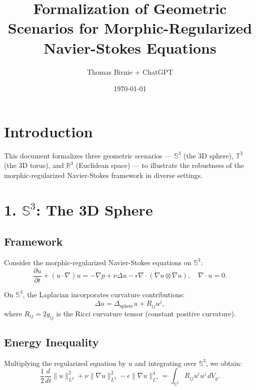 \documentclass[12pt]{article}
\begin{document}
\title{Formalization of Geometric Scenarios for Morphic-Regularized Navier-Stokes Equations}
\author{Thomas Birnie + ChatGPT}
\date{\today}
\maketitle

\section*{Introduction}
This document formalizes three geometric scenarios --- \( \mathbb{S}^3 \) (the 3D sphere), \( \mathbb{T}^3 \) (the 3D torus), and \( \mathbb{R}^3 \) (Euclidean space) --- to illustrate the robustness of the morphic-regularized Navier-Stokes framework in diverse settings. 

\section*{1. \( \mathbb{S}^3 \): The 3D Sphere}

\subsection*{Framework}
Consider the morphic-regularized Navier-Stokes equations on \( \mathbb{S}^3 \):
\begin{equation}
\frac{\partial u}{\partial t} + (u \cdot \nabla)u = -\nabla p + \nu \Delta u - \epsilon \nabla \cdot (\nabla u \otimes \nabla u), \quad \nabla \cdot u = 0.
\end{equation}

On \( \mathbb{S}^3 \), the Laplacian incorporates curvature contributions:
\begin{equation}
\Delta u = \Delta_{\text{sphere}} u + R_{ij} u^j,
\end{equation}
where \( R_{ij} = 2g_{ij} \) is the Ricci curvature tensor (constant positive curvature).

\subsection*{Energy Inequality}
Multiplying the regularized equation by \( u \) and integrating over \( \mathbb{S}^3 \), we obtain:
\begin{equation}
\frac{1}{2} \frac{d}{dt} \| u \|_{L^2}^2 + \nu \| \nabla u \|_{L^2}^2 - \epsilon \| \nabla u \|_{L^4}^4 = \int_{\mathbb{S}^3} R_{ij} u^i u^j \, dV_g.
\end{equation}
\end{document}

